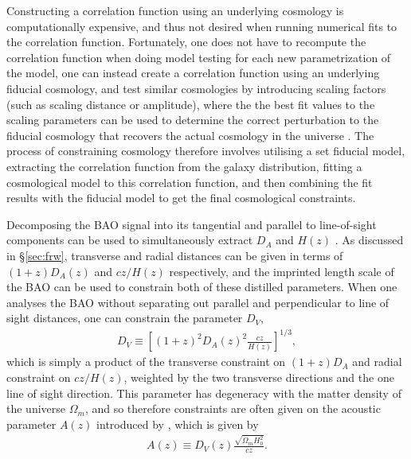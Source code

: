 \documentclass[titlesmallcaps, examinerscopy, copyrightpage]{uqthesis}
\begin{document}
Constructing a correlation function using an underlying cosmology is computationally expensive, and thus not desired when running numerical fits to the correlation function. Fortunately, one does not have to recompute the correlation function when doing model testing for each new parametrization of the model, one can instead create a correlation function using an underlying fiducial cosmology, and test similar cosmologies by introducing scaling factors (such as scaling distance or amplitude), where the the best fit values to the scaling parameters can be used to determine the correct perturbation to the fiducial cosmology that recovers the actual cosmology in the universe \citep{SanchezScoccola2012}. The process of constraining cosmology therefore involves utilising a set fiducial model, extracting the correlation function from the galaxy distribution, fitting a cosmological model to this correlation function, and then combining the fit results with the fiducial model to get the final cosmological constraints.






Decomposing the BAO signal into its tangential and parallel to line-of-sight components can be used to simultaneously extract $D_A$ and $H(z)$ \citep{BlakeGlazebrook2003, SeoEisenstein2003, Wang2006}. As discussed in \S\ref{sec:frw}, transverse and radial distances can be given in terms of $(1+z) D_A(z)$ and $c z/H(z)$ respectively, and the imprinted length scale of the BAO can be used to constrain both of these distilled parameters. When one analyses the BAO without separating out parallel and perpendicular to line of sight distances, one can constrain the parameter $D_V$, 
\begin{align} \label{eq:dv}
D_V \equiv \left[ (1+z)^2 D_A(z)^2 \frac{cz}{H(z)}\right]^{1/3},
\end{align}
which is simply a product of the transverse constraint on $(1+z) D_A$ and radial constraint on $cz/H(z)$, weighted by the two transverse directions and the one line of sight direction. This parameter has degeneracy with the matter density of the universe $\Omega_m$, and so therefore constraints are often given on the acoustic parameter $A(z)$ introduced by \citet{EisensteinZehavi2005}, which is given by
\begin{align}
A(z) \equiv D_V(z) \frac{\sqrt{\Omega_m H_0^2}}{cz}.
\end{align}
\end{document}

